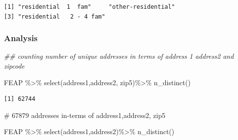 \documentclass[
  letterpaper,
  DIV=11,
  numbers=noendperiod]{scrartcl}
\newenvironment{Shaded}{\begin{snugshade}}{\end{snugshade}}
\newcommand{\AttributeTok}[1]{\textcolor[rgb]{0.40,0.45,0.13}{#1}}
\newcommand{\CommentTok}[1]{\textcolor[rgb]{0.37,0.37,0.37}{#1}}
\newcommand{\DocumentationTok}[1]{\textcolor[rgb]{0.37,0.37,0.37}{\textit{#1}}}
\newcommand{\FunctionTok}[1]{\textcolor[rgb]{0.28,0.35,0.67}{#1}}
\newcommand{\NormalTok}[1]{\textcolor[rgb]{0.00,0.23,0.31}{#1}}
\newcommand{\OtherTok}[1]{\textcolor[rgb]{0.00,0.23,0.31}{#1}}
\newcommand{\SpecialCharTok}[1]{\textcolor[rgb]{0.37,0.37,0.37}{#1}}
\newcommand{\StringTok}[1]{\textcolor[rgb]{0.13,0.47,0.30}{#1}}
\begin{document}
\begin{Shaded}
\end{Shaded}

\begin{verbatim}
[1] "residential  1  fam"     "other-residential"      
[3] "residential   2 - 4 fam"
\end{verbatim}

\hypertarget{analysis}{%
\subsubsection{Analysis}\label{analysis}}

\begin{Shaded}
\begin{Highlighting}[]
\DocumentationTok{\#\# counting number of unique addresses in terms of address 1 address2 and zipcode }

\NormalTok{FEAP }\SpecialCharTok{\%\textgreater{}\%} 
  \FunctionTok{select}\NormalTok{(address1,address2, zip5)}\SpecialCharTok{\%\textgreater{}\%}
  \FunctionTok{n\_distinct}\NormalTok{()}
\end{Highlighting}
\end{Shaded}

\begin{verbatim}
[1] 62744
\end{verbatim}

\begin{Shaded}
\begin{Highlighting}[]
\CommentTok{\# 67879 addresses in{-}terms of address1,address2, zip5}

\NormalTok{FEAP }\SpecialCharTok{\%\textgreater{}\%} 
  \FunctionTok{select}\NormalTok{(address1,address2)}\SpecialCharTok{\%\textgreater{}\%}
  \FunctionTok{n\_distinct}\NormalTok{()}
\end{Highlighting}
\end{Shaded}
\end{document}
